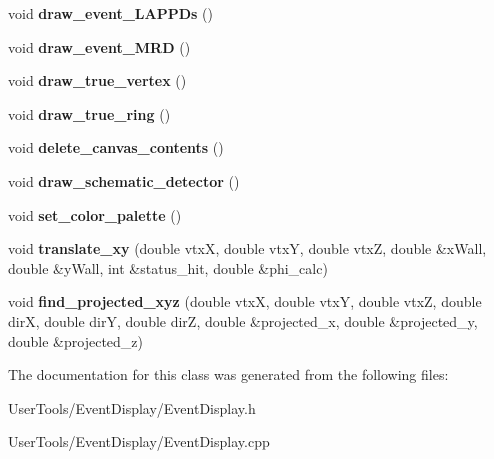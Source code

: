 \begin{DoxyCompactItemize}
\item 
\hypertarget{classEventDisplay_ae0d1b0fb901484e92518ec76061c5c9c}{void {\bfseries draw\-\_\-event\-\_\-\-L\-A\-P\-P\-Ds} ()}\label{classEventDisplay_ae0d1b0fb901484e92518ec76061c5c9c}

\item 
\hypertarget{classEventDisplay_a8c3315cc4f055772b275e7a5c9593526}{void {\bfseries draw\-\_\-event\-\_\-\-M\-R\-D} ()}\label{classEventDisplay_a8c3315cc4f055772b275e7a5c9593526}

\item 
\hypertarget{classEventDisplay_a13ff76de80459d2b68e24dbd0b24416e}{void {\bfseries draw\-\_\-true\-\_\-vertex} ()}\label{classEventDisplay_a13ff76de80459d2b68e24dbd0b24416e}

\item 
\hypertarget{classEventDisplay_ad9e11e4c29bf6cd9c616e8a88c9450a5}{void {\bfseries draw\-\_\-true\-\_\-ring} ()}\label{classEventDisplay_ad9e11e4c29bf6cd9c616e8a88c9450a5}

\item 
\hypertarget{classEventDisplay_a0c142aae987bce6741becd4254993e4b}{void {\bfseries delete\-\_\-canvas\-\_\-contents} ()}\label{classEventDisplay_a0c142aae987bce6741becd4254993e4b}

\item 
\hypertarget{classEventDisplay_a8e03ad3c8e618e6781a8e085d4577083}{void {\bfseries draw\-\_\-schematic\-\_\-detector} ()}\label{classEventDisplay_a8e03ad3c8e618e6781a8e085d4577083}

\item 
\hypertarget{classEventDisplay_a8e0374381693a843b58d33ac4a3debd9}{void {\bfseries set\-\_\-color\-\_\-palette} ()}\label{classEventDisplay_a8e0374381693a843b58d33ac4a3debd9}

\item 
\hypertarget{classEventDisplay_a3e7298c6aab4ea268f51a6c805ccdc9a}{void {\bfseries translate\-\_\-xy} (double vtx\-X, double vtx\-Y, double vtx\-Z, double \&x\-Wall, double \&y\-Wall, int \&status\-\_\-hit, double \&phi\-\_\-calc)}\label{classEventDisplay_a3e7298c6aab4ea268f51a6c805ccdc9a}

\item 
\hypertarget{classEventDisplay_a0a3b0b46289031922181d43a7db56271}{void {\bfseries find\-\_\-projected\-\_\-xyz} (double vtx\-X, double vtx\-Y, double vtx\-Z, double dir\-X, double dir\-Y, double dir\-Z, double \&projected\-\_\-x, double \&projected\-\_\-y, double \&projected\-\_\-z)}\label{classEventDisplay_a0a3b0b46289031922181d43a7db56271}

\end{DoxyCompactItemize}


The documentation for this class was generated from the following files\-:\begin{DoxyCompactItemize}
\item 
User\-Tools/\-Event\-Display/Event\-Display.\-h\item 
User\-Tools/\-Event\-Display/Event\-Display.\-cpp\end{DoxyCompactItemize}
